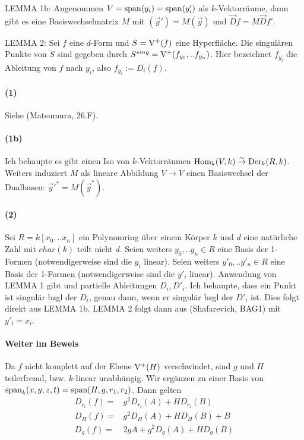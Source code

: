 LEMMA 1b: Angenommen $V = {\operatorname{span}}(y_i) = {\operatorname{span}}(y'_i)$ als $k$-Vektorräume, dann gibt es eine Basiswechselmatrix $M$ mit $(\vec y') = M(\vec y)$ und $\vec Df = M \vec Df'$.

LEMMA 2:
Sei $f$ eine $d$-Form und $S = \operatorname{V^+}(f)$ eine Hyperfläche. Die singulären Punkte von $S$ sind gegeben durch $S^{sing} = \operatorname{V^+}(f_{y_0},..f_{y_n})$. Hier bezeichnet $f_{y_i}$ die Ableitung von $f$ nach $y_i$, also $f_{y_i} := D_i(f)$.

\paragraph{(1)}
Siehe (Matsumura, 26.F).

\paragraph{(1b)}
Ich behaupte es gibt einen Iso von $k$-Vektorräumen ${\operatorname{Hom}}_k(V,k) \overset\sim\to {\operatorname{Der}}_k(R,k)$.
Weiters induziert $M$ als lineare Abbildung $V \to V$ einen Basiswechsel der Dualbasen: $\vec y'^* = M(\vec y^*)$.

\paragraph{(2)} 
Sei $R = k[x_0,..x_n]$ ein Polynomring über einem Körper $k$ und $d$ eine natürliche Zahl mit $char(k)$ teilt nicht $d$.
Seien weiters $y_0,..y_n \in R$ eine Basis der 1-Formen (notwendigerweise sind die $y_i$ linear).
Seien weiters $y'_0,..y'_n \in R$ eine Basis der 1-Formen (notwendigerweise sind die $y'_i$ linear).
Anwendung von LEMMA 1 gibt und partielle Ableitungen $D_i, D'_i$.
Ich behaupte, dass ein Punkt ist singulär bzgl der $D_i$, genau dann, wenn er singulär bzgl der $D'_i$ ist.
Dies folgt direkt aus LEMMA 1b.
LEMMA 2 folgt dann aus (Shafarevich, BAG1) mit $y'_i = x_i$.


\paragraph{Weiter im Beweis}
Da $f$ nicht komplett auf der Ebene $\operatorname{V^+}(H)$ verschwindet, sind $g$ und $H$ teilerfremd, bzw. $k$-linear unabhängig. Wir ergänzen zu einer Basis von ${\operatorname{span}}_k(x,y,z,t) = {\operatorname{span}}(H,g,r_1,r_2)$.
Dann gelten
\begin{align*}
D_{r_i}(f) =& g^2 D_{r_i}(A)  + H D_{r_i}(B) \\
D_H(f)     =& g^2 D_H(A)      + H D_H(B) + B \\
D_g(f)     =& 2gA + g^2D_g(A) + H D_g(B)
\end{align*}

